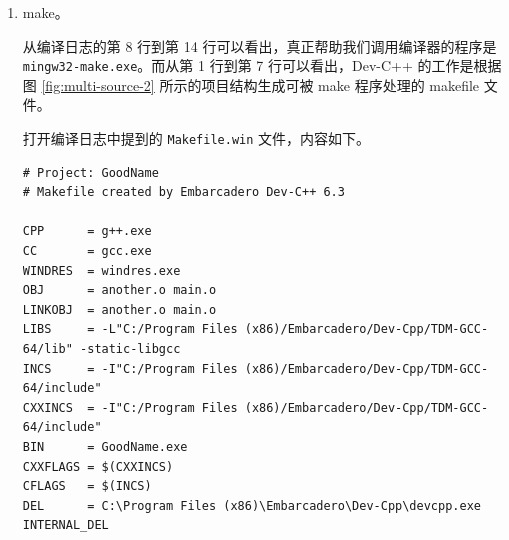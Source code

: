 \begin{enumerate}
	为什么不只在 \lstinline[language={}]{another.h} 中实现 \lstinline[language={[17]C++}, moreemph={[2]another}]{another} 函数，而要把声明和实现分离在两个文件中？在本例中，这似乎是可行的，进行文本替换后唯一的源文件 \lstinline[language={}]{main.cpp} 将变为：

	\begin{lstlisting}[language={[17]C++}, moreemph={[2]another, strlen}]
// main.cpp
#include <iostream>
#include <cstring>

long long another(const char* str)
{
	return std::strlen(str);
}

int main()
{
	long long ago { another("figure emerged") };
	std::cout << ago << std::endl;
}
	\end{lstlisting}

	问题实际上就在于文本替换。如果存在另一个源文件 \lstinline[language={}]{yet_another.cpp}，它也通过 \lstinline[language={[17]C++}]{#include} 指令包含了 \lstinline[language={}]{another.h}，则文本替换后，\lstinline[language={[17]C++}, moreemph={[2]another}]{another} 函数将存在两个实现：这是链接器不允许的。

	综上，声明与实现分离的原因是避免展开 \lstinline[language={[17]C++}]{#include} 指令后在多个源文件中出现重复的函数实现\footnote{可以使用 \lstinline[language={[17]C++}]{inline} 关键字告诉编译器这个函数可以因为多次 \texttt{\#include} 重复定义。尽管如此，一般仍然会分离函数的声明和实现，以避免展开 \texttt{\#include} 指令产生大量实现代码，从而提升编译速度。相关知识属于 C++ 语法范畴，此处不予详细讨论。}。

	\item make。

	从编译日志的第 8 行到第 14 行可以看出，真正帮助我们调用编译器的程序是 \lstinline[language={}]{mingw32-make.exe}。而从第 1 行到第 7 行可以看出，Dev-C++ 的工作是根据图 \ref{fig:multi-source-2} 所示的项目结构生成可被 make 程序处理的 makefile 文件。

	打开编译日志中提到的 \lstinline[language={}]{Makefile.win} 文件，内容如下。

	\begin{lstlisting}[language={[gnu]make}]
# Project: GoodName
# Makefile created by Embarcadero Dev-C++ 6.3

CPP      = g++.exe
CC       = gcc.exe
WINDRES  = windres.exe
OBJ      = another.o main.o
LINKOBJ  = another.o main.o
LIBS     = -L"C:/Program Files (x86)/Embarcadero/Dev-Cpp/TDM-GCC-64/lib" -static-libgcc
INCS     = -I"C:/Program Files (x86)/Embarcadero/Dev-Cpp/TDM-GCC-64/include"
CXXINCS  = -I"C:/Program Files (x86)/Embarcadero/Dev-Cpp/TDM-GCC-64/include"
BIN      = GoodName.exe
CXXFLAGS = $(CXXINCS)
CFLAGS   = $(INCS)
DEL      = C:\Program Files (x86)\Embarcadero\Dev-Cpp\devcpp.exe INTERNAL_DEL


\end{lstlisting}
\end{enumerate}
